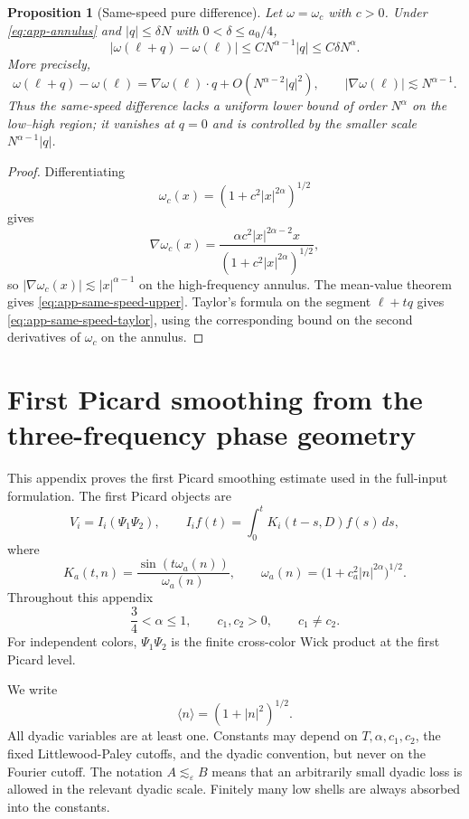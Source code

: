 \documentclass[10pt]{amsart}
\numberwithin{equation}{section}
\theoremstyle{plain}
\newtheorem{proposition}[theorem]{Proposition}
\theoremstyle{definition}
\theoremstyle{remark}
\newcommand{\eps}{\varepsilon}
\newcommand{\la}{\langle}
\newcommand{\ra}{\rangle}
\begin{document}
\begin{proposition}[Same-speed pure difference]\label{prop:same-speed-contrast}
Let $\omega=\omega_c$ with $c>0$.  Under \eqref{eq:app-annulus} and $|q|\le\delta N$ with $0<\delta\le a_0/4$,
\begin{equation}\label{eq:app-same-speed-upper}
 |\omega(\ell+q)-\omega(\ell)|\le C N^{\alpha-1}|q|\le C\delta N^\alpha.
\end{equation}
More precisely,
\begin{equation}\label{eq:app-same-speed-taylor}
 \omega(\ell+q)-\omega(\ell)=\nabla\omega(\ell)\cdot q+O(N^{\alpha-2}|q|^2),\qquad |\nabla\omega(\ell)|\lesssim N^{\alpha-1}.
\end{equation}
Thus the same-speed difference lacks a uniform lower bound of order $N^\alpha$ on the low--high region; it vanishes at $q=0$ and is controlled by the smaller scale $N^{\alpha-1}|q|$.
\end{proposition}

\begin{proof}
Differentiating
\[
 \omega_c(x)=(1+c^2|x|^{2\alpha})^{1/2}
\]
gives
\[
 \nabla\omega_c(x)=\frac{\alpha c^2|x|^{2\alpha-2}x}{(1+c^2|x|^{2\alpha})^{1/2}},
\]
so $|\nabla\omega_c(x)|\lesssim |x|^{\alpha-1}$ on the high-frequency annulus.  The mean-value theorem gives \eqref{eq:app-same-speed-upper}.  Taylor's formula on the segment $\ell+tq$ gives \eqref{eq:app-same-speed-taylor}, using the corresponding bound on the second derivatives of $\omega_c$ on the annulus.
\end{proof}

\section{First Picard smoothing from the three-frequency phase geometry}\label{app:first-picard-phase}

This appendix proves the first Picard smoothing estimate used in the full-input formulation.  The first Picard objects are
\[
        V_i=I_i(\Psi_1\Psi_2),
        \qquad
        I_i f(t)=\int_0^t K_i(t-s,D)f(s)\,ds,
\]
where
\[
        K_a(t,n)=\frac{\sin(t\omega_a(n))}{\omega_a(n)},
        \qquad
        \omega_a(n)=\bigl(1+c_a^2|n|^{2\alpha}\bigr)^{1/2}.
\]
Throughout this appendix
\[
        \frac34<\alpha\le1,
        \qquad
        c_1,c_2>0,
        \qquad
        c_1\ne c_2.
\]
For independent colors, \(\Psi_1\Psi_2\) is the finite cross-color Wick product at the first Picard level.

We write
\[
        \la n\ra=(1+|n|^2)^{1/2}.
\]
All dyadic variables are at least one.  Constants may depend on \(T,\alpha,c_1,c_2\), the fixed Littlewood-Paley cutoffs, and the dyadic convention, but never on the Fourier cutoff.  The notation \(A\lesssim_\eps B\) means that an arbitrarily small dyadic loss is allowed in the relevant dyadic scale.  Finitely many low shells are always absorbed into the constants.
\end{document}
